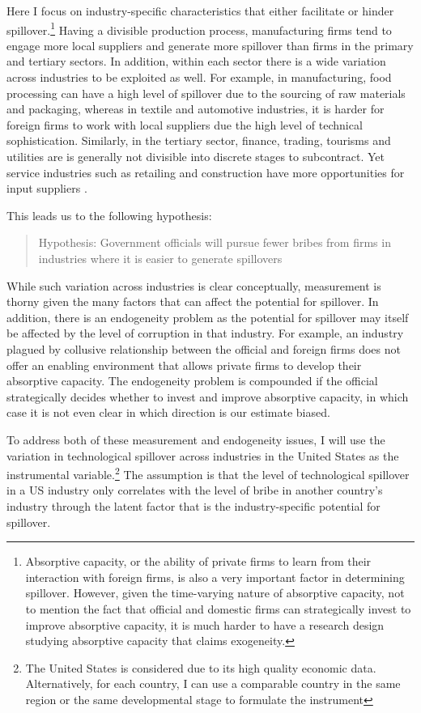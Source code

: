 Here I focus on industry-specific characteristics that either facilitate or hinder spillover.\footnote{Absorptive capacity, or the ability of private firms to learn from their interaction with foreign firms, is also a very important factor in determining spillover. However, given the time-varying nature of absorptive capacity, not to mention the fact that official and domestic firms can strategically invest to improve absorptive capacity, it is much harder to have a research design studying absorptive capacity that claims exogeneity.} Having a divisible production process, manufacturing firms tend to engage more local suppliers and generate more spillover than firms in the primary and tertiary sectors. In addition, within each sector there is a wide variation across industries to be exploited as well. For example, in manufacturing, food processing can have a high level of spillover due to the sourcing of raw materials and packaging, whereas in textile and automotive industries, it is harder for foreign firms to work with local suppliers due the high level of technical sophistication. Similarly, in the tertiary sector, finance, trading, tourisms and utilities are is generally not divisible into discrete stages to subcontract. Yet service industries such as retailing and construction have more opportunities for input suppliers \citep[138]{UNCTAD2001}.

This leads us to the following hypothesis:

\begin{quote}
Hypothesis: Government officials will pursue fewer bribes from firms in industries where it is easier to generate spillovers
\end{quote}

While such variation across industries is clear conceptually, measurement is thorny given the many factors that can affect the potential for spillover. In addition, there is an endogeneity problem as the potential for spillover may itself be affected by the level of corruption in that industry. For example, an industry plagued by collusive relationship between the official and foreign firms does not offer an enabling environment that allows private firms to develop their absorptive capacity. The endogeneity problem is compounded if the official strategically decides whether to invest and improve absorptive capacity, in which case it is not even clear in which direction is our estimate biased.

To address both of these measurement and endogeneity issues, I will use the variation in technological spillover across industries in the United States as the instrumental variable.\footnote{The United States is considered due to its high quality economic data. Alternatively, for each country, I can use a comparable country in the same region or the same developmental stage to formulate the instrument} The assumption is that the level of technological spillover in a US industry only correlates with the level of bribe in another country's industry through the latent factor that is the industry-specific potential for spillover.

